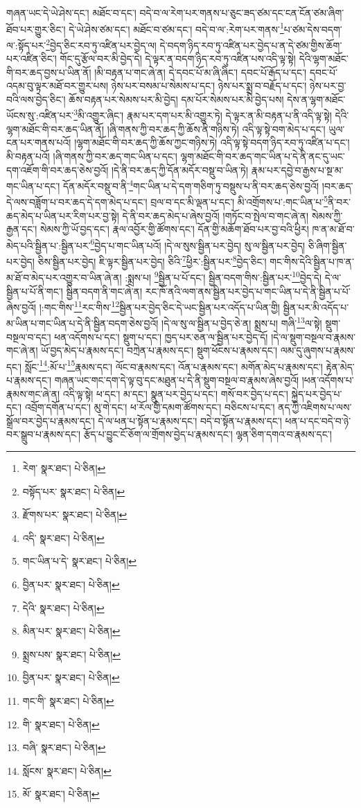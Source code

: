 གཞན་ཡང་དེ་ཡེ་ཤེས་དང་། མཐོང་བ་དང་། བདེ་བ་ལ་རེག་པར་གནས་པ་ཅུང་ཟད་ཙམ་དང་ངན་ངོན་ཙམ་ཞིག་ཐོབ་པར་གྱུར་ཅིང་། དེ་ཡེ་ཤེས་ཙམ་དང་། མཐོང་བ་ཙམ་དང་། བདེ་བ་ལ་:རེག་པར་གནས་\footnote{རེག་  སྣར་ཐང་།  པེ་ཅིན། }པ་ཙམ་དེས་བདག་ལ་:སྟོད་པར་\footnote{བསྟོད་པར་  སྣར་ཐང་།  པེ་ཅིན། }བྱེད་ཅིང་རབ་ཏུ་འཛིན་པར་བྱེད་ལ། དེ་བདག་ཉིད་རབ་ཏུ་འཛིན་པར་བྱེད་པ་ན་དེ་ཙམ་གྱིས་ཆོག་པར་འཛིན་ཅིང་། གོང་དུ་རྩོལ་བར་མི་བྱེད་དེ། དེ་ལྟར་ན་བདག་ཉིད་རབ་ཏུ་འཛིན་པས་འདི་ལྟ་སྟེ། དེའི་ལྷག་མཐོང་གི་བར་ཆད་བྱས་པ་ཡིན་ནོ། །མི་བརྟན་པ་གང་ཞེ་ན། དེ་དབང་པོ་མ་ཞི་ཞིང་། དབང་པོ་རྒོད་པ་དང་། དབང་པོ་འདམ་བུ་ལྟར་མཐོ་བར་གྱུར་པས། ཉེས་པར་བསམ་པ་སེམས་པ་དང་། ཉེས་པར་སྨྲ་བ་བརྗོད་པ་དང་། ཉེས་པར་བྱ་བའི་ལས་བྱེད་ཅིང་། ཆོས་བརྟན་པར་སེམས་པར་མི་བྱེད། དམ་པོར་སེམས་པར་མི་བྱེད་པས། དེས་ན་ལྷག་མཐོང་ཡོངས་སུ་:འཛིན་པར་\footnote{རྫོགས་པར་  སྣར་ཐང་།  པེ་ཅིན། }མི་འགྱུར་ཞིང་། རྣམ་པར་དག་པར་མི་འགྱུར་ཏེ། དེ་ལྟར་ན་མི་བརྟན་པ་ནི་འདི་ལྟ་སྟེ། དེའི་ལྷག་མཐོང་གི་བར་ཆད་ཡིན་ནོ། །ཞི་གནས་ཀྱི་བར་ཆད་ཀྱི་ཆོས་ནི་གཉིས་ཏེ། འདི་ལྟ་སྟེ་བག་མེད་པ་དང་། ཡུལ་ངན་པར་གནས་པའོ། །ལྷག་མཐོང་གི་བར་ཆད་ཀྱི་ཆོས་ཀྱང་གཉིས་ཏེ། འདི་ལྟ་སྟེ་བདག་ཉིད་རབ་ཏུ་འཛིན་པ་དང་། མི་བརྟན་པའོ། །ཞི་གནས་ཀྱི་བར་ཆད་གང་ཡིན་པ་དང་། ལྷག་མཐོང་གི་བར་ཆད་གང་ཡིན་པ་དེ་ནི་ནང་དུ་ཡང་དག་འཇོག་གི་བར་ཆད་ཅེས་བྱའོ། །དེ་ནི་བར་ཆད་ཀྱི་དོན་མདོར་བསྡུ་བ་ཡིན་ཏེ། རྣམ་པར་དབྱེ་བ་རྒྱས་པ་སྔ་མ་གང་ཡིན་པ་དང་། དོན་མདོར་བསྡུ་བ་ནི་\footnote{འདི་  སྣར་ཐང་།  པེ་ཅིན། }གང་ཡིན་པ་དེ་དག་གཅིག་ཏུ་བསྡུས་པ་ནི་བར་ཆད་ཅེས་བྱའོ། །བར་ཆད་དེ་ལས་བཟློག་པ་བར་ཆད་དེ་དག་མེད་པ་དང་། བྲལ་བ་དང་མི་ལྡན་པ་དང་། མི་འགྲོགས་པ་:གང་ཡིན་པ་\footnote{གང་ཡིན་པ་དེ་  སྣར་ཐང་།  པེ་ཅིན། }ནི་བར་ཆད་མེད་པ་ཡིན་པར་རིག་པར་བྱ་སྟེ། དེ་ནི་བར་ཆད་མེད་པ་ཞེས་བྱའོ། །གཏོང་བ་སྤེལ་བ་གང་ཞེ་ན། སེམས་ཀྱི་རྒྱན་དང་། སེམས་ཀྱི་ཡོ་བྱད་དང་། རྣལ་འབྱོར་གྱི་ཚོགས་དང་། དོན་གྱི་མཆོག་ཐོབ་པར་བྱ་བའི་ཕྱིར། ཁ་ན་མ་ཐོ་བ་མེད་པའི་སྦྱིན་པ་:སྦྱིན་པར་\footnote{བྱིན་པར་  སྣར་ཐང་།  པེ་ཅིན། }བྱེད་པ་གང་ཡིན་པའོ། །དེ་ལ་སུས་སྦྱིན་པར་བྱེད། སུ་ལ་སྦྱིན་པར་བྱེད། ཅི་ཞིག་སྦྱིན་པར་བྱེད། ཅིས་སྦྱིན་པར་བྱེད། ཇི་ལྟར་སྦྱིན་པར་བྱེད། ཅིའི་\footnote{དེའི་  སྣར་ཐང་།  པེ་ཅིན། }ཕྱིར་:སྦྱིན་པར་\footnote{མིན་པར་  སྣར་ཐང་།  པེ་ཅིན། }བྱེད་ཅིང་། གང་གིས་དེའི་སྦྱིན་པ་ཁ་ན་མ་ཐོ་བ་མེད་པར་འགྱུར་བ་ཡིན་ཞེ་ན། :སྨྲས་པ། \footnote{སྨྲས་པས་  སྣར་ཐང་།  པེ་ཅིན། }སྦྱིན་པ་པོ་དང་། སྦྱིན་བདག་གིས་:སྦྱིན་པར་\footnote{བྱིན་པར་  སྣར་ཐང་།  པེ་ཅིན། }བྱེད་དེ། དེ་ལ་སྦྱིན་པ་པོ་ནི་གང་། སྦྱིན་བདག་ནི་གང་ཞེ་ན། རང་ཁོ་ནའི་ལག་ནས་སྦྱིན་པར་བྱེད་པ་གང་ཡིན་པ་དེ་ནི་སྦྱིན་པ་པོ་ཞེས་བྱའོ། །:གང་གིས་\footnote{གང་གི་  སྣར་ཐང་།  པེ་ཅིན། }རང་གིས་\footnote{གི་  སྣར་ཐང་།  པེ་ཅིན། }སྦྱིན་པར་བྱེད་ཅིང་དེ་ཡང་སྦྱིན་པར་འདོད་པ་ཡིན་གྱི། སྦྱིན་པར་མི་འདོད་པ་མ་ཡིན་པ་གང་ཡིན་པ་དེ་ནི་སྦྱིན་བདག་ཅེས་བྱའོ། །དེ་ལ་སུ་ལ་སྦྱིན་པ་བྱེད་ཅེ་ན། སྨྲས་པ། གཞི་\footnote{བཞི་  སྣར་ཐང་།  པེ་ཅིན། }ལ་སྟེ། སྡུག་བསྔལ་བ་དང་། ཕན་འདོགས་པ་དང་། སྡུག་པ་དང་། ཁྱད་པར་ཅན་ལ་སྦྱིན་པར་བྱེད་དོ། །དེ་ལ་སྡུག་བསྔལ་བ་རྣམས་གང་ཞེ་ན། ཡོ་བྱད་མེད་པ་རྣམས་དང་། བཀྲེན་པ་རྣམས་དང་། སྡུག་ཕོངས་པ་རྣམས་དང་། ལམ་དུ་ཞུགས་པ་རྣམས་དང་། སློང་\footnote{སློངས་  སྣར་ཐང་།  པེ་ཅིན། }:མོ་པ་\footnote{མོ་  སྣར་ཐང་།  པེ་ཅིན། }རྣམས་དང་། ལོང་བ་རྣམས་དང་། འོན་པ་རྣམས་དང་། མགོན་མེད་པ་རྣམས་དང་། རྟེན་མེད་པ་རྣམས་དང་། གཞན་ཡང་གང་དག་དེ་ལྟ་བུ་དང་མཐུན་པ་དེ་ནི་སྡུག་བསྔལ་བ་རྣམས་ཞེས་བྱའོ། །ཕན་འདོགས་པ་རྣམས་གང་ཞེ་ན། འདི་ལྟ་སྟེ། ཕ་དང་། མ་དང་། སྣུན་པར་བྱེད་པ་དང་། གསོ་བར་བྱེད་པ་དང་། སྐྱེད་པར་བྱེད་པ་དང་། འབྲོག་དགོན་པ་དང་། མུ་གེ་དང་། ཕ་རོལ་གྱི་དམག་ཚོགས་དང་། བཅིངས་པ་དང་། ནད་ཀྱི་འཇིགས་པ་ལས་སྒྲོལ་བར་བྱེད་པ་རྣམས་དང་། དེ་ལ་ཕན་པ་སྟོན་པ་རྣམས་དང་། བདེ་བ་སྟོན་པ་རྣམས་དང་། ཕན་པ་དང་བདེ་བ་ཉེ་བར་སྒྲུབ་པ་རྣམས་དང་། རྩོད་པ་བྱུང་ངོ་ཅོག་ལ་གྲོགས་བྱེད་པ་རྣམས་དང་། ལྷན་ཅིག་དགའ་བ་རྣམས་དང་། 